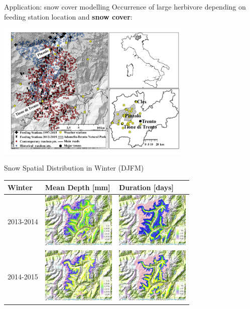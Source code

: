 \documentclass[
  ignorenonframetext,
]{beamer}
\begin{document}
\begin{frame}{Application: snow cover modelling}
\protect\hypertarget{application-snow-cover-modelling}{}
Occurrence of large herbivore depending on feeding station location and
\textbf{snow cover}:

\includegraphics[width=0.7\textwidth,height=\textheight]{resources/images/rendena_roe_deer_meteo_v2.jpg}\\
\end{frame}

\begin{frame}{Snow Spatial Distribution in Winter (DJFM)}
\protect\hypertarget{snow-spatial-distribution-in-winter-djfm}{}
\begin{longtable}[]{@{}lll@{}}
\toprule
Winter & Mean Depth {[}mm{]} & Duration {[}days{]}\tabularnewline
\midrule
\endhead
2013-2014 &
\includegraphics[width=\textwidth,height=1.04167in]{resources/images/map/mean_OBS_2014_winter.png}
&
\includegraphics[width=\textwidth,height=1.04167in]{resources/images/map/nday_OBS_2014_winter.png}\tabularnewline
2014-2015 &
\includegraphics[width=\textwidth,height=1.04167in]{resources/images/map/mean_OBS_2015_winter.png}
&
\includegraphics[width=\textwidth,height=1.04167in]{resources/images/map/nday_OBS_2015_winter.png}\tabularnewline
\bottomrule
\end{longtable}
\end{frame}
\end{document}
